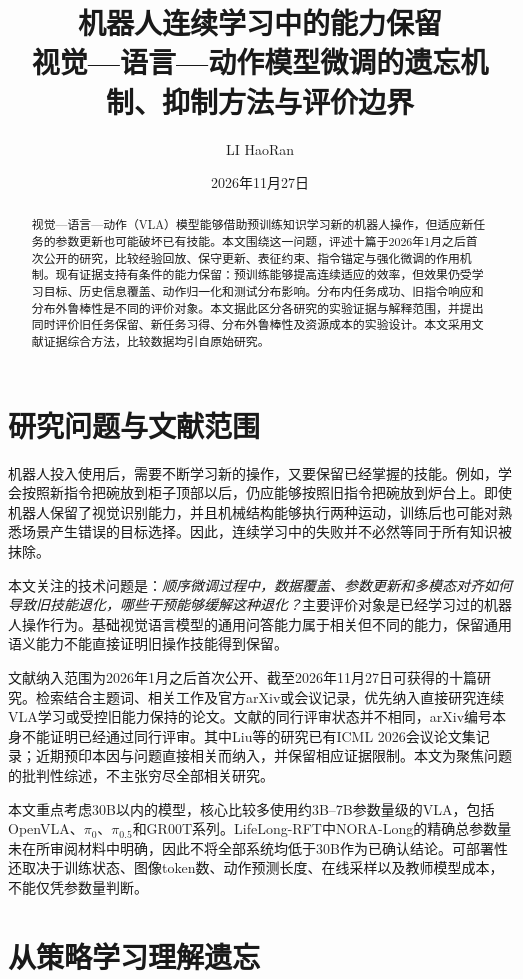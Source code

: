 \documentclass[UTF8,11pt,a4paper,fontset=fandol]{ctexart}
\title{\vspace{-1.5em}\textbf{机器人连续学习中的能力保留}\\[0.4em]\large 视觉—语言—动作模型微调的遗忘机制、抑制方法与评价边界}
\author{LI HaoRan}
\date{2026年11月27日}
\begin{document}
\maketitle
\begin{abstract}
视觉—语言—动作（VLA）模型能够借助预训练知识学习新的机器人操作，但适应新任务的参数更新也可能破坏已有技能。本文围绕这一问题，评述十篇于2026年1月之后首次公开的研究，比较经验回放、保守更新、表征约束、指令锚定与强化微调的作用机制。现有证据支持有条件的能力保留：预训练能够提高连续适应的效率，但效果仍受学习目标、历史信息覆盖、动作归一化和测试分布影响。分布内任务成功、旧指令响应和分布外鲁棒性是不同的评价对象。本文据此区分各研究的实验证据与解释范围，并提出同时评价旧任务保留、新任务习得、分布外鲁棒性及资源成本的实验设计。本文采用文献证据综合方法，比较数据均引自原始研究。
\end{abstract}

\section{研究问题与文献范围}
机器人投入使用后，需要不断学习新的操作，又要保留已经掌握的技能。例如，学会按照新指令把碗放到柜子顶部以后，仍应能够按照旧指令把碗放到炉台上。即使机器人保留了视觉识别能力，并且机械结构能够执行两种运动，训练后也可能对熟悉场景产生错误的目标选择。因此，连续学习中的失败并不必然等同于所有知识被抹除。

本文关注的技术问题是：\emph{顺序微调过程中，数据覆盖、参数更新和多模态对齐如何导致旧技能退化，哪些干预能够缓解这种退化？}主要评价对象是已经学习过的机器人操作行为。基础视觉语言模型的通用问答能力属于相关但不同的能力，保留通用语义能力不能直接证明旧操作技能得到保留。

文献纳入范围为2026年1月之后首次公开、截至2026年11月27日可获得的十篇研究。检索结合主题词、相关工作及官方arXiv或会议记录，优先纳入直接研究连续VLA学习或受控旧能力保持的论文。文献的同行评审状态并不相同，arXiv编号本身不能证明已经通过同行评审。其中Liu等的研究已有ICML 2026会议论文集记录；近期预印本因与问题直接相关而纳入，并保留相应证据限制。本文为聚焦问题的批判性综述，不主张穷尽全部相关研究。

本文重点考虑30B以内的模型，核心比较多使用约3B--7B参数量级的VLA，包括OpenVLA、$\pi_0$、$\pi_{0.5}$和GR00T系列。LifeLong-RFT中NORA-Long的精确总参数量未在所审阅材料中明确，因此不将全部系统均低于30B作为已确认结论。可部署性还取决于训练状态、图像token数、动作预测长度、在线采样以及教师模型成本，不能仅凭参数量判断。

\section{从策略学习理解遗忘}
\end{document}
